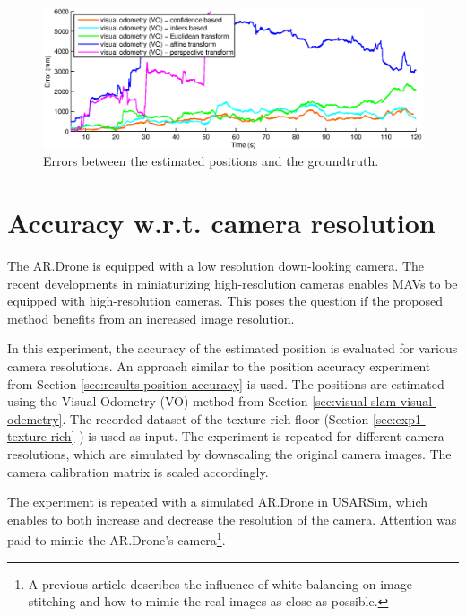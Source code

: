 \begin{figure}[htb!]
\centering
\includegraphics[width=\linewidth]{images/exp4-transform-error.eps}
\caption{Errors between the estimated positions and the groundtruth.}
\label{fig:exp4-transform-error}
\end{figure}





\clearpage
\section{Accuracy w.r.t. camera resolution}
\label{sec:res-cam-resolution}
The AR.Drone is equipped with a low resolution down-looking camera.
The recent developments in miniaturizing high-resolution cameras enables MAVs to be equipped with high-resolution cameras.
This poses the question if the proposed method benefits from an increased image resolution.

In this experiment, the accuracy of the estimated position is evaluated for various camera resolutions.
An approach similar to the position accuracy experiment from Section \ref{sec:results-position-accuracy} is used.
The positions are estimated using the Visual Odometry (VO) method from Section \ref{sec:visual-slam-visual-odemetry}.
The recorded dataset of the texture-rich floor (Section \ref{sec:exp1-texture-rich} ) is used as input.
The experiment is repeated for different camera resolutions, which are simulated by downscaling the original camera images.
The camera calibration matrix is scaled accordingly.

The experiment is repeated with a simulated AR.Drone in USARSim, which enables to both increase and decrease the resolution of the camera.
Attention was paid to mimic the AR.Drone's camera\footnote{A previous article \cite{Visser2011imav} describes the influence of white balancing on image stitching and how to mimic the real images as close as possible.}.


